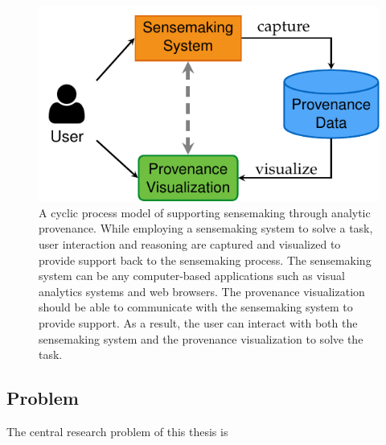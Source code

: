 
\begin{figure}[!htb]
	\centering
	\includegraphics{workflow}
	\caption{A cyclic process model of supporting sensemaking through analytic provenance. While employing a sensemaking system to solve a task, user interaction and reasoning are captured and visualized to provide support back to the sensemaking process. The sensemaking system can be any computer-based applications such as visual analytics systems and web browsers. The provenance visualization should be able to communicate with the sensemaking system to provide support. As a result, the user can interact with both the sensemaking system and the provenance visualization to solve the task.}
	\label{fig:intro-workflow}
\end{figure}

\subsection{Problem}
The central research problem of this thesis is
\begin{center}
\end{center}

